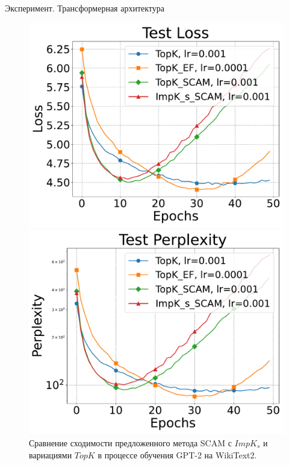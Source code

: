 \documentclass{beamer}
\begin{document}
\begin{frame}{Эксперимент. Трансформерная архитектура}
\begin{figure}[ht]
\begin{minipage}{0.4\textwidth}
        \end{minipage}
        \begin{minipage}{0.4\textwidth}
            \includegraphics[width=\textwidth]{../paper/figures/gpt2/experiment2/Test Loss.pdf}
        \end{minipage}
        \begin{minipage}{0.4\textwidth}
            \includegraphics[width=\textwidth]{../paper/figures/gpt2/experiment2/Test Perplexity.pdf}
        \end{minipage}
        \caption{Сравнение сходимости предложенного метода SCAM с $ImpK_s$ и вариациями $TopK$ в процессе обучения GPT-2 на WikiText2.}
    \end{figure}

\end{frame}
\end{document}
